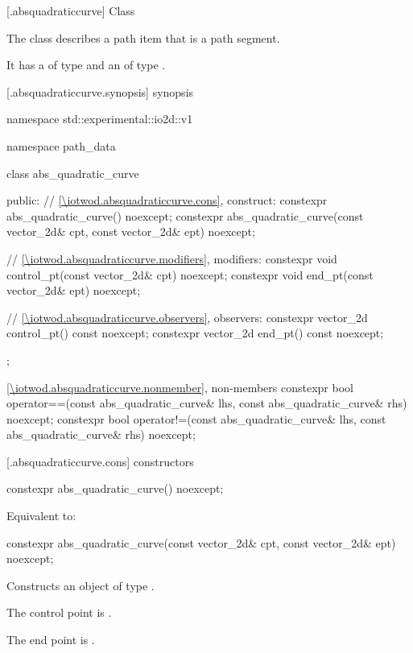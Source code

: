 [\iotwod.absquadraticcurve] {Class }

\pnum
{}%
The class  describes a path item that is a path segment.

\pnum
It has a  of type  and an  of type .

 [\iotwod.absquadraticcurve.synopsis] { synopsis}

\begin{codeblock}
namespace std::experimental::io2d::v1 {
  namespace path_data {
    class abs_quadratic_curve {
    public:
      // \ref{\iotwod.absquadraticcurve.cons}, construct:
      constexpr abs_quadratic_curve() noexcept;
      constexpr abs_quadratic_curve(const vector_2d& cpt, const vector_2d& ept)
        noexcept;

      // \ref{\iotwod.absquadraticcurve.modifiers}, modifiers:
      constexpr void control_pt(const vector_2d& cpt) noexcept;
      constexpr void end_pt(const vector_2d& ept) noexcept;

      // \ref{\iotwod.absquadraticcurve.observers}, observers:
      constexpr vector_2d control_pt() const noexcept;
      constexpr vector_2d end_pt() const noexcept;
    };
    
    \ref{\iotwod.absquadraticcurve.nonmember}, non-members
    constexpr bool operator==(const abs_quadratic_curve& lhs,
      const abs_quadratic_curve& rhs) noexcept;
    constexpr bool operator!=(const abs_quadratic_curve& lhs,
      const abs_quadratic_curve& rhs) noexcept;
  }
}
\end{codeblock}

 [\iotwod.absquadraticcurve.cons] { constructors}

%
\begin{itemdecl}
constexpr abs_quadratic_curve() noexcept;
\end{itemdecl}
\begin{itemdescr}
\pnum
\effects
Equivalent to: 
\end{itemdescr}

%
\begin{itemdecl}
constexpr abs_quadratic_curve(const vector_2d& cpt, const vector_2d& ept)
  noexcept;
\end{itemdecl}
\begin{itemdescr}
\pnum
\effects
Constructs an object of type .

\pnum
The control point is .

\pnum
The end point is .
\end{itemdescr}

